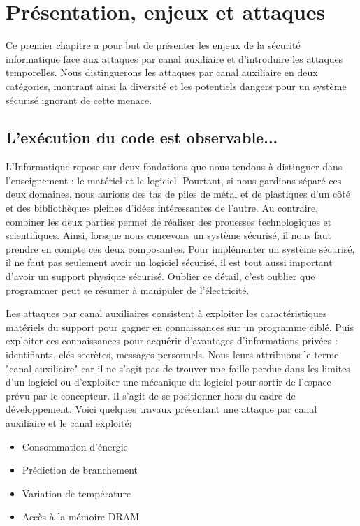 \chapter{Présentation, enjeux et attaques}
\label{chap:constantTimePresentation}


Ce premier chapitre a pour but de présenter les enjeux de la sécurité informatique face aux attaques par canal auxiliaire et d'introduire les attaques temporelles. Nous distinguerons les attaques par canal auxiliaire en deux catégories, montrant ainsi la diversité et les potentiels dangers pour un système sécurisé ignorant de cette menace.



\section{L'exécution du code est observable...}

L'Informatique repose sur deux fondations que nous tendons à distinguer dans l'enseignement : le matériel et le logiciel. Pourtant, si nous gardions séparé ces deux domaines, nous aurions des tas de piles de métal et de plastiques d'un côté et des bibliothèques pleines d'idées intéressantes de l'autre. Au contraire, combiner les deux parties permet de réaliser des prouesses technologiques et scientifiques. Ainsi, lorsque nous concevons un système sécurisé, il nous faut prendre en compte ces deux composantes. Pour implémenter un système sécurisé, il ne faut pas seulement avoir un logiciel sécurisé, il est tout aussi important d'avoir un support physique sécurisé. Oublier ce détail, c'est oublier que programmer peut se résumer à manipuler de l'électricité.\medbreak

Les attaques par canal auxiliaires consistent à exploiter les caractéristiques matériels du support pour gagner en connaissances sur un programme ciblé. Puis exploiter ces connaissances pour acquérir d'avantages d'informations privées : identifiants, clés secrètes, messages personnels. Nous leurs attribuons le terme "canal auxiliaire" car il ne s'agit pas de trouver une faille perdue dans les limites d'un logiciel ou d'exploiter une mécanique du logiciel pour sortir de l'espace prévu par le concepteur. Il s'agit de se positionner hors du cadre de développement. Voici quelques travaux présentant une attaque par canal auxiliaire et le canal exploité:
\begin{itemize}
    \item[\cite{DPA_Attack}] Consommation d'énergie 
    \item[\cite{Branch_Attack}] Prédiction de branchement 
    \item[\cite{Thermal_Attack}] Variation de température
    \item[\cite{DRAM_Attack}] Accès à la mémoire DRAM
\end{itemize}\medbreak


